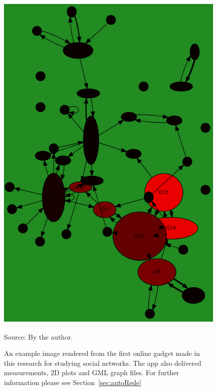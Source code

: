 \begin{apendicesenv}
\begin{figure}[h!]
\begin{center}
\includegraphics[scale=.25]{figs/autoRede_}
\caption{An example image rendered from the first online gadget made in this research for studying social networks.
	The app also delivered measurements, 2D plots and GML graph files. For further information please see Section~\ref{sec:autoRede}}
\label{fig:autoRede}
\begin{flushleft}\footnotesize
Source: By the author.\
\end{flushleft}
\end{center}
\end{figure}


\end{apendicesenv}
